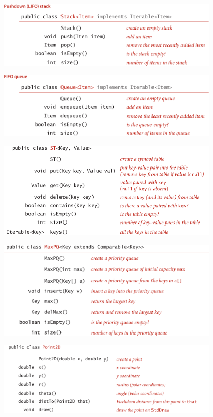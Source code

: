 \documentclass[addpoints]{exam}
\begin{document}
\begin{questions}
\begin{center}
\vspace{0.5cm}

\includegraphics[width=0.8\textwidth]{Pics/API-Stack}

\vspace{0.5cm}

\includegraphics[width=0.8\textwidth]{Pics/API-Queue}

\vspace{0.5cm}

\includegraphics[width=0.8\textwidth]{Pics/API-ST}

\vspace{1cm}

\includegraphics[width=0.8\textwidth]{Pics/API-MaxPQ}

\vspace{1cm}

\includegraphics[width=0.8\textwidth]{Pics/API-Point2d}


\end{center}
\end{questions}
\end{document}

